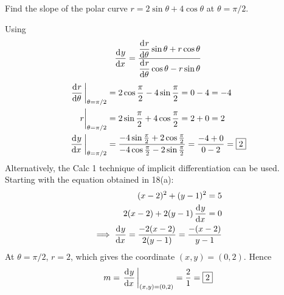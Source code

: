 \documentclass[12pt,answers]{exam}
\begin{document}
\begin{questions}

\newpage
\question[6]
Find the slope of the polar curve $r = 2\sin\theta + 4\cos\theta$ at $\theta = \pi/2$.
\begin{solution}
    Using
    \[
        \dod{y}{x} 
        = \frac{\dod{r}{\theta} \sin \theta + r \cos \theta}{\dod{r}{\theta} \cos \theta - r\sin \theta}
    \]
    \begin{align*}
        \eval{\dod{r}{\theta}}_{\theta=\pi/2} &= 2\cos \frac\pi2 - 4 \sin \frac\pi2 = 0 - 4 = -4 \\ 
        \eval{r}_{\theta=\pi/2} &= 2 \sin \frac\pi2 + 4 \cos \frac\pi2 = 2 + 0 = 2 \\ 
        \eval{\dod{y}{x}}_{\theta = \pi/2} &= 
        \frac{-4 \sin \frac\pi2 + 2 \cos \frac\pi2}{-4 \cos \frac\pi2 - 2 \sin\frac\pi2} = \frac{-4+0}{0-2} = \boxed{2}
    \end{align*}
    Alternatively, the Calc 1 technique of implicit differentiation can be used.
    Starting with the equation obtained in 18(a):
    \begin{align*}
        (x-2)^2 + (y-1)^2 = 5 \\ 
        2(x-2) + 2(y-1) \dod{y}{x} = 0 \\
        \implies \dod{y}{x} = \frac{-2(x-2)}{2(y-1)} = \frac{-(x-2)}{y-1}
    \end{align*}
    At $\theta = \pi/2$, $r = 2$, which gives the coordinate $(x,y) = (0,2)$.
    Hence 
    \[
      m = \eval{\dod{y}{x}}_{(x,y) = (0,2)} = \frac{2}{1} = \boxed{2}
    \]


\end{solution}
\end{questions}
\end{document}
